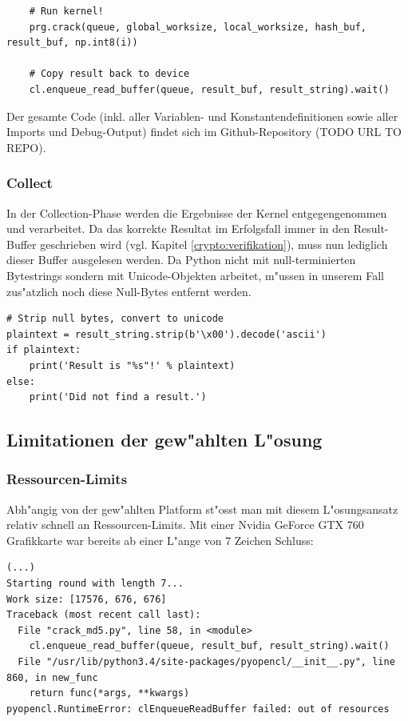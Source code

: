 \begin{refsection}
\begin{small}
\begin{verbatim}
    # Run kernel!
    prg.crack(queue, global_worksize, local_worksize, hash_buf, result_buf, np.int8(i))

    # Copy result back to device
    cl.enqueue_read_buffer(queue, result_buf, result_string).wait()
\end{verbatim}
\end{small}

\noindent Der gesamte Code (inkl. aller Variablen- und Konstantendefinitionen
sowie aller Imports und Debug-Output) findet sich im Github-Repository (TODO URL
TO REPO).

\subsubsection{Collect}

In der Collection-Phase werden die Ergebnisse der Kernel entgegengenommen und
verarbeitet. Da das korrekte Resultat im Erfolgsfall immer in den Result-Buffer
geschrieben wird (vgl. Kapitel \ref{crypto:verifikation}), muss nun lediglich
dieser Buffer ausgelesen werden. Da Python nicht mit null-terminierten
Bytestrings sondern mit Unicode-Objekten arbeitet, m"ussen in unserem Fall
zus"atzlich noch diese Null-Bytes entfernt werden.

\begin{small}
\begin{verbatim}
# Strip null bytes, convert to unicode
plaintext = result_string.strip(b'\x00').decode('ascii')
if plaintext:
    print('Result is "%s"!' % plaintext)
else:
    print('Did not find a result.')
\end{verbatim}
\end{small}


\subsection{Limitationen der gew"ahlten L"osung}

\subsubsection{Ressourcen-Limits}
\label{crypto:resourcenlimits}

Abh"angig von der gew"ahlten Platform st"osst man mit diesem L"osungsansatz
relativ schnell an Ressourcen-Limits. Mit einer Nvidia GeForce GTX 760
Grafikkarte war bereits ab einer L"ange von 7 Zeichen Schluss:

\begin{small}
\begin{verbatim}
(...)
Starting round with length 7...
Work size: [17576, 676, 676]
Traceback (most recent call last):
  File "crack_md5.py", line 58, in <module>
    cl.enqueue_read_buffer(queue, result_buf, result_string).wait()
  File "/usr/lib/python3.4/site-packages/pyopencl/__init__.py", line 860, in new_func
    return func(*args, **kwargs)
pyopencl.RuntimeError: clEnqueueReadBuffer failed: out of resources
\end{verbatim}
\end{small}


\end{refsection}
